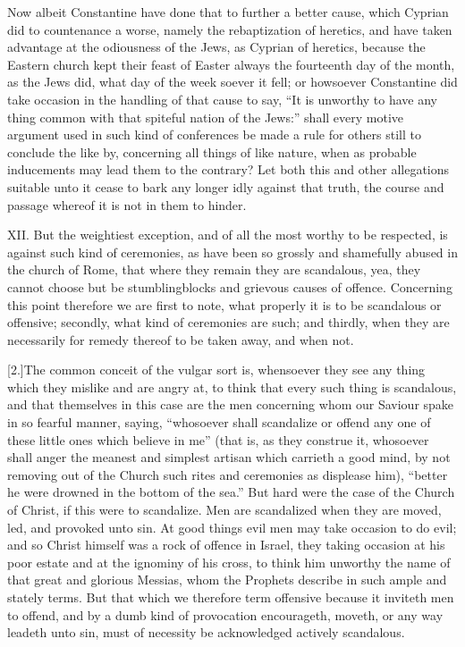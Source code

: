 Now albeit Constantine have done that to further a better cause, which Cyprian did to countenance a worse, namely the rebaptization of heretics, and have taken advantage at the odiousness of the Jews, as Cyprian of heretics, because the Eastern church kept their feast of Easter always the fourteenth day of the month, as the Jews did, what day of the week soever it fell; or howsoever Constantine did take occasion in the handling of that cause to say, “It is unworthy to have any thing common with that spiteful nation of the Jews:” shall every motive argument used in such kind of conferences be made a rule for others still to conclude the like by, concerning all things of like nature, when as probable inducements may lead them to the contrary? Let both this and other allegations suitable unto it cease to bark any longer idly against that truth, the course and passage whereof it is not in them to hinder.

XII. But the weightiest exception, and of all the most worthy to be respected, is against such kind of ceremonies, as have been so grossly and shamefully abused in the church of Rome, that where they remain they are scandalous, yea,  they cannot choose but be stumblingblocks and grievous causes of offence. Concerning this point therefore we are first to note, what properly it is to be scandalous or offensive; secondly, what kind of ceremonies are such; and thirdly, when they are necessarily for remedy thereof to be taken away, and when not.

[2.]The common conceit of the vulgar sort is, whensoever they see any thing which they mislike and are angry at, to think that every such thing is scandalous, and that themselves in this case are the men concerning whom our Saviour spake in so fearful manner, saying, “whosoever shall scandalize or offend any one of these little ones which believe in me” (that is, as they construe it, whosoever shall anger the meanest and simplest artisan which carrieth a good mind, by not removing out of the Church such rites and ceremonies as displease him), “better he were drowned in the bottom of the sea.” But hard were the case of the Church of Christ, if this were to scandalize. Men are scandalized when they are moved, led, and provoked unto sin. At good things evil men may take occasion to do evil; and so Christ himself was a rock of offence in Israel, they taking occasion at his poor estate and at the ignominy of his cross, to think him unworthy the name of that great and glorious Messias, whom the Prophets describe in such ample and stately terms. But that which we therefore term offensive because it inviteth men to offend, and by a dumb kind of provocation encourageth, moveth, or any way leadeth unto sin, must of necessity be acknowledged actively scandalous.

